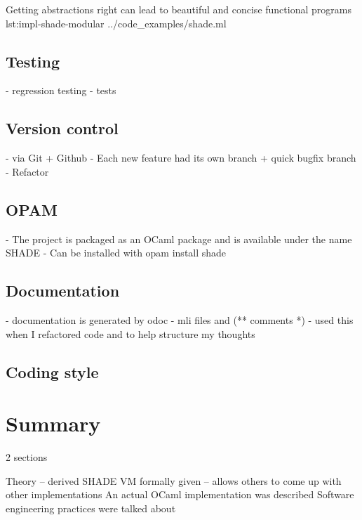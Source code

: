 \documentclass[class=article, crop=false]{standalone}
\begin{document}
{Getting abstractions right can lead to beautiful and concise functional programs}
{lst:impl-shade-modular}
{../code_examples/shade.ml}

\subsection{Testing}
- regression testing
- tests

\subsection{Version control}
- via Git + Github
- Each new feature had its own branch + quick bugfix branch
- Refactor

\subsection{OPAM}
- The project is packaged as an OCaml package and is available under the name SHADE
- Can be installed with opam install shade

\subsection{Documentation}
- documentation is generated by odoc
- mli files and (** comments *)
- used this when I refactored code and to help structure my thoughts

\subsection{Coding style}

\section{Summary}

2 sections

Theory -- derived
SHADE VM formally given -- allows others to come up with other implementations
An actual OCaml implementation was described
Software engineering practices were talked about
\end{document}
